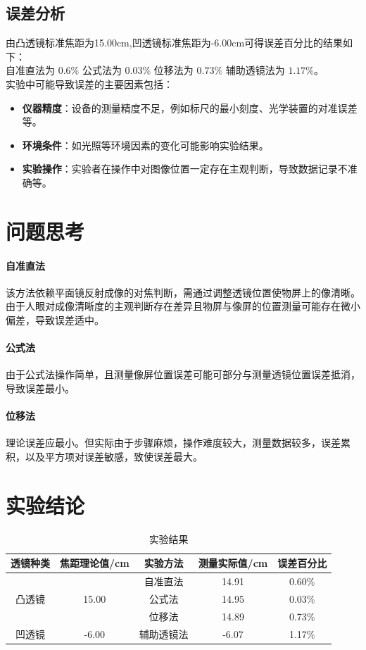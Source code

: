 \documentclass[12pt,a4paper]{article}
\begin{document}
		\subsection{误差分析}
		由凸透镜标准焦距为15.00cm,凹透镜标准焦距为-6.00cm可得误差百分比的结果如下：\\
		自准直法为 $0.6\%$ \quad 公式法为 $0.03\%$ \quad 位移法为 $0.73\%$ \quad 辅助透镜法为 $1.17\%$。\\
		实验中可能导致误差的主要因素包括：
			\begin{itemize}
				\item \textbf{仪器精度}：设备的测量精度不足，例如标尺的最小刻度、光学装置的对准误差等。
				\item \textbf{环境条件}：如光照等环境因素的变化可能影响实验结果。
				\item \textbf{实验操作}：实验者在操作中对图像位置一定存在主观判断，导致数据记录不准确等。
			\end{itemize}


	\section{问题思考}
		\paragraph{自准直法} 该方法依赖平面镜反射成像的对焦判断，需通过调整透镜位置使物屏上的像清晰。由于人眼对成像清晰度的主观判断存在差异且物屏与像屏的位置测量可能存在微小偏差，导致误差适中。
		\paragraph{公式法}   由于公式法操作简单，且测量像屏位置误差可能可部分与测量透镜位置误差抵消，导致误差最小。
		\paragraph{位移法}   理论误差应最小。但实际由于步骤麻烦，操作难度较大，测量数据较多，误差累积，以及平方项对误差敏感，致使误差最大。
	
	\section{实验结论}
	\begin{table}[h]
		\centering
		\renewcommand{\arraystretch}{1.2}  %
		\begin{tabular}{|c|c|c|c|c|}
		\hline
		\textbf{透镜种类} & \textbf{焦距理论值/cm} & \textbf{实验方法} & \textbf{测量实际值/cm} & \textbf{误差百分比} \\
		\hline
		\multirow{3}{*}{凸透镜} & \multirow{3}{*}{15.00} & 自准直法 & 14.91 & 0.60\% \\
		\cline{3-5}
		 &  & 公式法 & 14.95 & 0.03\% \\
		\cline{3-5}
		 &  & 位移法 & 14.89 & 0.73\% \\
		\hline
		凹透镜 & -6.00 & 辅助透镜法 & -6.07 & 1.17\% \\
		\hline
		\end{tabular}
		\caption{实验结果}
		\label{tab:lens-data}
		\end{table}
\end{document}
